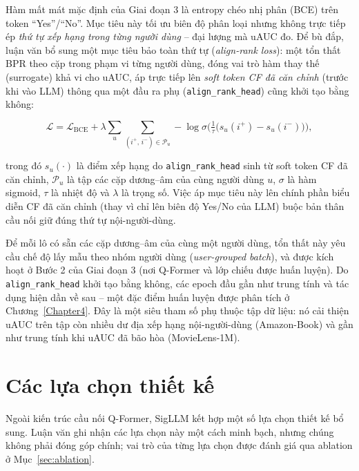 Hàm mất mát mặc định của Giai đoạn 3 là entropy chéo nhị phân (BCE) trên token
``Yes''/``No''. Mục tiêu này tối ưu biên độ phân loại nhưng không trực tiếp ép \textit{thứ
tự xếp hạng trong từng người dùng} -- đại lượng mà uAUC đo. Để bù đắp, luận văn bổ sung một
mục tiêu bảo toàn thứ tự (\textit{align-rank loss}): một tổn thất BPR theo cặp trong phạm
vi từng người dùng, đóng vai trò hàm thay thế (surrogate) khả vi cho uAUC, áp trực tiếp lên
\textit{soft token CF đã căn chỉnh} (trước khi vào LLM) thông qua một đầu ra phụ
(\texttt{align\_rank\_head}) cũng khởi tạo bằng không:

\begin{equation} \label{eq:align-rank}
\mathcal{L} = \mathcal{L}_{\text{BCE}}
  + \lambda \sum_{u} \sum_{(i^{+},\, i^{-}) \in \mathcal{P}_u}
    -\log \sigma\!\Big( \tfrac{1}{\tau}\big( s_u(i^{+}) - s_u(i^{-}) \big) \Big),
\end{equation}

trong đó $s_u(\cdot)$ là điểm xếp hạng do \texttt{align\_rank\_head} sinh từ soft token CF
đã căn chỉnh, $\mathcal{P}_u$ là tập các cặp dương--âm của cùng người dùng $u$, $\sigma$ là
hàm sigmoid, $\tau$ là nhiệt độ và $\lambda$ là trọng số. Việc áp mục tiêu này lên chính
phần biểu diễn CF đã căn chỉnh (thay vì chỉ lên biên độ Yes/No của LLM) buộc bản thân cầu
nối giữ đúng thứ tự nội-người-dùng.

Để mỗi lô có sẵn các cặp dương--âm của cùng một người dùng, tổn thất này yêu cầu chế độ lấy
mẫu theo nhóm người dùng (\textit{user-grouped batch}), và được kích hoạt ở Bước 2 của Giai
đoạn 3 (nơi Q-Former và lớp chiếu được huấn luyện). Do \texttt{align\_rank\_head} khởi tạo
bằng không, các epoch đầu gần như trung tính và tác dụng hiện dần về sau -- một đặc điểm
huấn luyện được phân tích ở Chương~\ref{Chapter4}. Đây là một siêu tham số phụ thuộc tập dữ
liệu: nó cải thiện uAUC trên tập còn nhiều dư địa xếp hạng nội-người-dùng (Amazon-Book) và
gần như trung tính khi uAUC đã bão hòa (MovieLens-1M).

\section{Các lựa chọn thiết kế}
\label{sec:lua-chon-thiet-ke}

Ngoài kiến trúc cầu nối Q-Former, SigLLM kết hợp một số lựa chọn thiết kế bổ sung. Luận
văn ghi nhận các lựa chọn này một cách minh bạch, nhưng chúng không phải đóng góp chính;
vai trò của từng lựa chọn được đánh giá qua ablation ở Mục~\ref{sec:ablation}.

